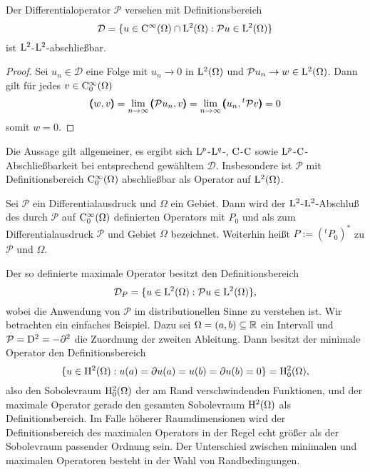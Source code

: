 \begin{lem}
Der Differentialoperator $\mathcal P$ versehen mit Definitionsbereich
\begin{equation}
  \mathcal D= \{ u\in\mathrm C^\infty(\Omega) \cap \mathrm L^2(\Omega) :  \mathcal Pu\in\mathrm L^2(\Omega) \}
\end{equation}
ist $\mathrm L^2$-$\mathrm L^2$-abschließbar.
\end{lem}
\begin{proof}
Sei $u_n\in\mathcal D$ eine Folge mit $u_n\to 0$ in $\mathrm L^2(\Omega)$ und $\mathcal Pu_n \to w\in\mathrm L^2(\Omega)$. Dann gilt f\"ur jedes 
$v\in\mathrm C^\infty_0(\Omega)$
\begin{equation}
 \pmb(w,v\pmb)=\lim_{n\to\infty}   \pmb(\mathcal Pu_n,v\pmb) = \lim_{n\to\infty} \pmb(u_n,{}^t{\mathcal P}v\pmb) = 0
\end{equation}
somit $w=0$.
\end{proof}

Die Aussage gilt allgemeiner, es ergibt sich $\mathrm L^p$-$\mathrm L^q$-, $\mathrm C$-$\mathrm C$ sowie $\mathrm L^p$-$\mathrm C$-Abschließbarkeit bei entsprechend gewähltem $\mathcal D$. Insbesondere ist $\mathcal P$ mit Definitionsbereich $\mathrm C^\infty_0(\Omega)$ abschließbar als Operator auf $\mathrm L^2(\Omega)$. 

\begin{df} 
Sei $\mathcal P$ ein Differentialausdruck und $\Omega$ ein Gebiet. Dann wird der $\mathrm L^2$-$\mathrm L^2$-Abschluß des durch $\mathcal P$ auf $\mathrm C_0^\infty(\Omega)$ definierten Operators mit $P_0$ und als  zum Differentialausdruck $\mathcal P$ und Gebiet $\Omega$ bezeichnet. 
Weiterhin heißt $P := ({}^t P_0)^*$  zu $\mathcal P$ und $\Omega$.
\end{df}

Der so definierte maximale Operator besitzt den Definitionsbereich
\begin{equation}
   \mathcal D_P = \{ u\in\mathrm L^2(\Omega) : \mathcal Pu \in\mathrm L^2(\Omega)\},
\end{equation}
wobei die Anwendung von $\mathcal P$ im distributionellen Sinne zu verstehen ist. Wir betrachten ein einfaches Beispiel. Dazu sei $\Omega=(a,b)\subseteq\mathbb R$ ein Intervall und $\mathcal P = \mathrm D^2 = - \partial^2$ die Zuordnung der zweiten Ableitung. Dann besitzt der minimale Operator den Definitionsbereich
\begin{equation}
    \{ u\in\mathrm H^2(\Omega) :  u(a)=\partial u(a)=u(b)=\partial u(b) = 0\} = \mathrm H^2_0(\Omega),
\end{equation}
also den Sobolevraum $\mathrm H^2_0(\Omega)$ der am Rand verschwindenden Funktionen, und der maximale Operator gerade den gesamten Sobolevraum $\mathrm H^2(\Omega)$ als Definitionsbereich. Im Falle h\"oherer Raumdimensionen wird der Definitionsbereich des maximalen Operators in der Regel echt größer als der Sobolevraum passender Ordnung sein.
Der Unterschied zwischen minimalen und maximalen Operatoren besteht in der Wahl von Randbedingungen. 

